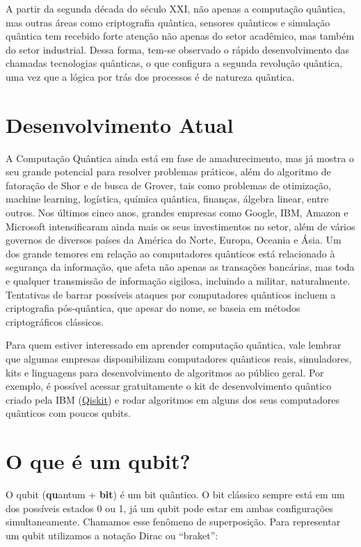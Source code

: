 A partir da segunda década do século XXI, não apenas a computação
quântica, mas outras áreas como criptografia quântica, sensores
quânticos e simulação quântica tem recebido forte atenção não apenas do
setor acadêmico, mas também do setor industrial.
Dessa forma, tem-se observado o rápido desenvolvimento das chamadas tecnologias quânticas, o
que configura a segunda revolução quântica, uma vez que a lógica por
trás dos processos é de natureza quântica.

\section{Desenvolvimento Atual}\label{sec:desenvolvimento-atual}

A Computação Quântica ainda está em fase de amadurecimento, mas já
mostra o seu grande potencial para resolver problemas práticos, além do
algoritmo de fatoração de Shor e de busca de Grover, tais como problemas
de otimização, machine learning, logística, química quântica, finanças,
álgebra linear, entre outros.
Nos últimos cinco anos, grandes empresas como Google, IBM, Amazon e Microsoft intensificaram ainda mais os seus investimentos no setor, além de vários governos de diversos países da
América do Norte, Europa, Oceania e Ásia.
Um dos grande temores em relação ao computadores quânticos está relacionado à segurança da
informação, que afeta não apenas as transações bancárias, mas toda e
qualquer transmissão de informação sigilosa, incluindo a militar,
naturalmente.
Tentativas de barrar possíveis ataques por computadores
quânticos incluem a criptografia pós-quântica, que apesar do nome, se
baseia em métodos criptográficos clássicos.

Para quem estiver interessado em aprender computação quântica, vale
lembrar que algumas empresas disponibilizam computadores quânticos
reais, simuladores, kits e linguagens para desenvolvimento de algoritmos
ao público geral.
Por exemplo, é possível acessar gratuitamente o kit de desenvolvimento quântico criado pela IBM
(\href{https://qiskit.org/}{Qiskit}) e rodar algoritmos em alguns dos
seus computadores quânticos com poucos qubits.

\section{O que é um qubit?}\label{sec:qubit}

O qubit (\textbf{qu}antum + \textbf{bit}) é um bit quântico.
O bit clássico sempre está em um dos possíveis estados 0 ou 1, já um qubit
pode estar em ambas configurações simultaneamente.
Chamamos esse fenômeno de {superposição}.
Para representar um qubit utilizamos a notação Dirac ou “braket”:

